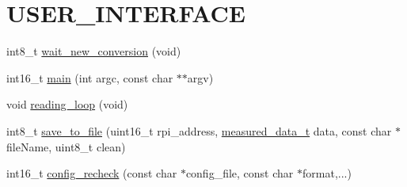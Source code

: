 \hypertarget{a00003}{\section{U\-S\-E\-R\-\_\-\-I\-N\-T\-E\-R\-F\-A\-C\-E}
\label{d1/d7c/a00003}
}




  


\begin{DoxyCompactItemize}
\item 
int8\-\_\-t \hyperlink{a00003_ga7b6d584350762c53419945480d6958d3}{wait\-\_\-new\-\_\-conversion} (void)
\begin{DoxyCompactList}\small\item\em 

 \end{DoxyCompactList}\end{DoxyCompactItemize}
\begin{DoxyCompactItemize}
\item 
int16\-\_\-t \hyperlink{a00003_ga3ba649a584853038d5fd50ad1751379d}{main} (int argc, const char $\ast$$\ast$argv)
\begin{DoxyCompactList}\small\item\em 

 \end{DoxyCompactList}\end{DoxyCompactItemize}
\begin{DoxyCompactItemize}
\item 
void \hyperlink{a00003_gaeb3af492d3421787fcbb2cd1bbbaf62c}{reading\-\_\-loop} (void)
\begin{DoxyCompactList}\small\item\em 

 \end{DoxyCompactList}\end{DoxyCompactItemize}
\begin{DoxyCompactItemize}
\item 
int8\-\_\-t \hyperlink{a00003_ga9e259879c5d746107c4a70fe08aba924}{save\-\_\-to\-\_\-file} (uint16\-\_\-t rpi\-\_\-address, \hyperlink{a00029}{measured\-\_\-data\-\_\-t} data, const char $\ast$file\-Name, uint8\-\_\-t clean)
\begin{DoxyCompactList}\small\item\em 

 \end{DoxyCompactList}\end{DoxyCompactItemize}
\begin{DoxyCompactItemize}
\item 
int16\-\_\-t \hyperlink{a00003_gac93e16d1e9d6a04b52373bf3428cc79c}{config\-\_\-recheck} (const char $\ast$config\-\_\-file, const char $\ast$format,...)
\begin{DoxyCompactList}\small\item\em 

 \end{DoxyCompactList}\end{DoxyCompactItemize}


